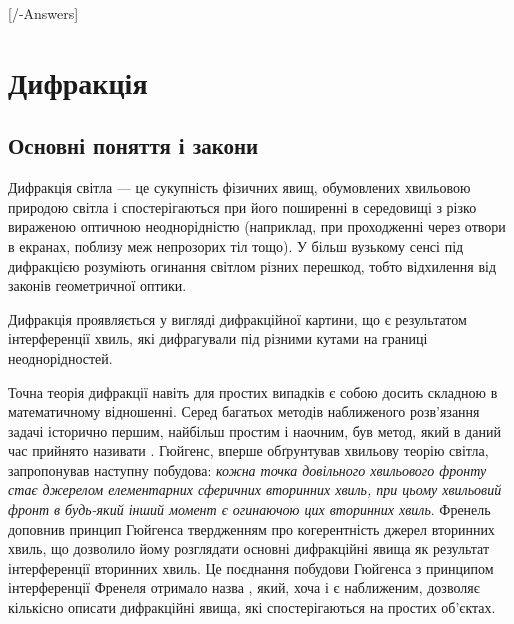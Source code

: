 
[\currfilebase/\currfilebase-Answers]
\chapter{Дифракція}\label{\currfilebase}
\makeatletter
{}
\makeatother


\section{Основні поняття і закони}


Дифракція світла --- це сукупність фізичних явищ, обумовлених хвильовою природою світла і спостерігаються при його поширенні в середовищі з різко вираженою оптичною неоднорідністю (наприклад, при проходженні через отвори в екранах, поблизу меж непрозорих тіл тощо). У більш вузькому сенсі під дифракцією розуміють огинання світлом різних перешкод, тобто відхилення від законів геометричної оптики.

Дифракція проявляється у вигляді дифракційної картини,
що є результатом інтерференції хвиль, які дифрагували під різними кутами
на границі неоднорідностей.

Точна теорія дифракції навіть для простих випадків є собою досить складною в математичному відношенні. Серед багатьох методів наближеного розв'язання задачі історично першим, найбільш простим і наочним, був метод, який в даний час прийнято називати . Гюйгенс, вперше обґрунтував хвильову теорію світла, запропонував наступну побудова: \emph{кожна точка довільного хвильового фронту стає джерелом елементарних сферичних вторинних хвиль, при цьому хвильовий фронт в будь-який інший момент є огинаючою цих вторинних хвиль}. Френель доповнив принцип Гюйгенса твердженням про когерентність джерел вторинних хвиль, що дозволило йому розглядати основні дифракційні явища як результат інтерференції вторинних хвиль. Це поєднання побудови Гюйгенса з принципом інтерференції Френеля отримало назва , який, хоча і є наближеним, дозволяє кількісно описати дифракційні явища, які спостерігаються на простих об'єктах.

